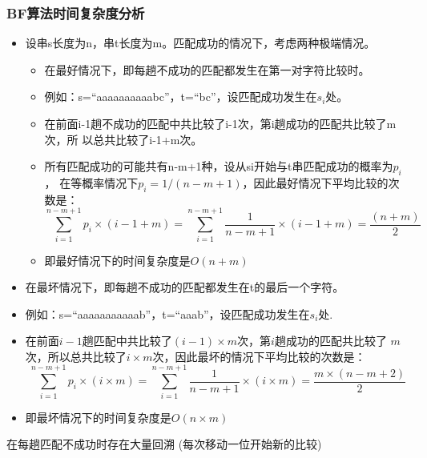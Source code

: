 \begin{frame}[fragile]
  \frametitle{BF算法时间复杂度分析}
  \begin{itemize}
  \item 设串s长度为n，串t长度为m。匹配成功的情况下，考虑两种极端情况。
    \begin{itemize}
    \item 在最好情况下，即每趟不成功的匹配都发生在第一对字符比较时。
    \item 例如：s=“aaaaaaaaaabc”，t=“bc”，设匹配成功发生在$s_i$处。
    \item 在前面i-1趟不成功的匹配中共比较了i-1次，第i趟成功的匹配共比较了m次，所
      以总共比较了i-1+m次。
    \item 所有匹配成功的可能共有n-m+1种，设从si开始与t串匹配成功的概率为$p_i$，
      在等概率情况下$p_i=1/(n-m+1)$，因此最好情况下平均比较的次数是：
      \[\sum_{i=1}^{n-m+1} p_i \times (i-1+m) = \sum_{i=1}^{n-m+1} \dfrac{1}{n-m+1} \times (i-1+m) = \dfrac{(n+m)}{2}\]

    \item 即最好情况下的时间复杂度是$O(n+m)$
    \end{itemize}
  \end{itemize}
\end{frame}

\begin{frame}[fragile]
  \begin{itemize}
  \item 在最坏情况下，即每趟不成功的匹配都发生在t的最后一个字符。
  \item 例如：s=“aaaaaaaaaaab”，t=“aaab”，设匹配成功发生在$s_i$处.
  \item 在前面$i-1$趟匹配中共比较了$(i-1) \times m$次，第$i$趟成功的匹配共比较了
    $m$次，所以总共比较了$i \times m$次，因此最坏的情况下平均比较的次数是：
    \[\sum_{i=1}^{n-m+1} p_i \times (i \times m) = \sum_{i=1}^{n-m+1} \dfrac{1}{n-m+1} \times (i \times m) = \dfrac{m \times (n-m+2)}{2}\]
  \item 即最坏情况下的时间复杂度是$O(n×m)$
  \end{itemize}

  \begin{tcolorbox}[title=为什么BF算法时间性能低？]
    在每趟匹配不成功时存在大量回溯 (每次移动一位开始新的比较)
  \end{tcolorbox}
\end{frame}

